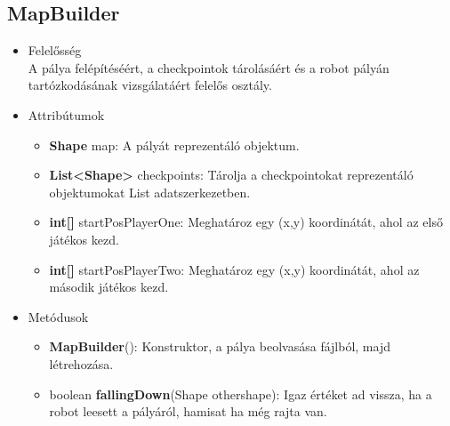 \subsection{MapBuilder}
\begin{itemize}
\item Felelősség\\
A pálya felépítéséért, a checkpointok tárolásáért és a robot pályán tartózkodásának vizsgálatáért felelős osztály.
\item Attribútumok
	\begin{itemize}
		\item \textbf{Shape} map: A pályát reprezentáló objektum. 
		\item \textbf{List<Shape>} checkpoints: Tárolja a checkpointokat reprezentáló objektumokat List adatszerkezetben.
		\item \textbf{int[]} startPosPlayerOne: Meghatároz egy (x,y) koordinátát, ahol az első játékos kezd.
		\item \textbf{int[]} startPosPlayerTwo: Meghatároz egy (x,y) koordinátát, ahol az második játékos kezd.
	\end{itemize}
\item Metódusok
	\begin{itemize}
		\item \textbf{MapBuilder}(): Konstruktor, a pálya beolvasása fájlból, majd létrehozása.
		\item boolean \textbf{fallingDown}(Shape othershape): Igaz értéket ad vissza, ha a robot leesett a pályáról, hamisat ha még rajta van.
	\end{itemize}
\end{itemize}


